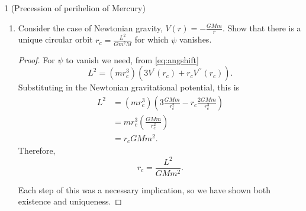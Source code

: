 \documentclass[11pt]{article}
\begin{document}
\begin{problem}{1 (Precession of perihelion of Mercury)}
\begin{enumerate}[label=(\alph*)]
\begin{proof}
            \begin{equation}
			      \begin{aligned}
				      \psi                & = 2\pi\frac{\tau - T}{T} = 2\pi \left(\frac{2 \pi}{T\omega} - 1\right) = 2\pi\left(\frac{2\pi}{T \sqrt{\frac{3}{mr_{c}} V^{\prime}(r_c) + \frac{1}{m} V^{\prime\prime}(r_c)}} -1\right) \\
				                          & = 2\pi\left(\frac{2\pi L}{2\pi m r_c^2 \sqrt{\frac{3}{m r_{c}} V^{\prime}(r_c) + \frac{1}{m} V^{\prime\prime}(r_c)}} - 1\right)                                                         \\
				      \label{eq:angshift} & = 2\pi\left(\frac{L}{\sqrt{m r_{c}^3} \sqrt{3 V^{\prime}(r_c) + r_c V^{\prime\prime}(r_c)}} - 1\right).
			      \end{aligned}
            \end{equation}
		      \end{proof}
		\item Consider the case of Newtonian gravity, \( V(r) = - \frac{GMm}{r}.\)
		      Show that there is a unique circular orbit \( r_c = \frac{L^2}{Gm^2 M} \) for which \(\psi\) vanishes.
		      \begin{proof}
			      For \(\psi\) to vanish we need, from \cref{eq:angshift}
			      \begin{equation}
				      \label{eq:31}
				      L^2 = (m r_{c}^3) (3 V^{\prime}(r_c) + r_c V^{\prime\prime}(r_c)).
			      \end{equation}
			      Substituting in the Newtonian gravitational potential, this is
            \begin{equation}
			      \begin{aligned}
				      \label{eq:32}
				      L^2 & = (m r_c^3)(3 \frac{GMm}{r_c^2} - r_c \frac{2GMm}{r_c^3}) \\
				          & = m r_c^3 \left( \frac{GMm}{r_c^2} \right)                \\
				          & = r_c GMm^2.
			      \end{aligned}
            \end{equation}
			      Therefore,
			      \begin{equation}
				      \label{eq:33}
				      r_c = \frac{L^2}{GM m^2}.
			      \end{equation}

			      Each step of this was a necessary implication, so we have shown both existence and uniqueness.
		      \end{proof}


\end{enumerate}
\end{problem}
\end{document}

